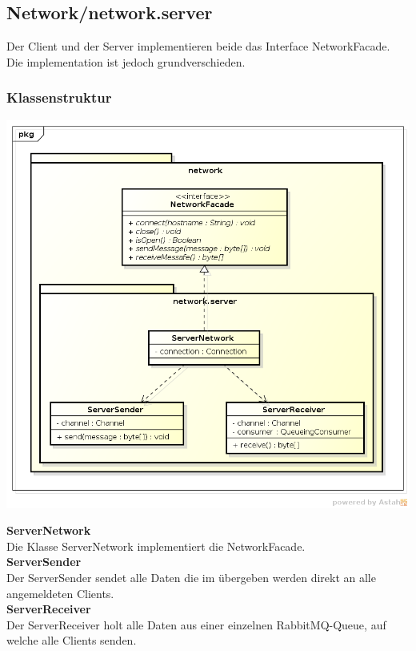 \documentclass[11pt]{scrartcl}
\begin{document}
\newpage

\subsection{Network/network.server}

Der Client und der Server implementieren beide das Interface NetworkFacade. Die implementation ist jedoch grundverschieden.

\subsubsection{Klassenstruktur}
\includegraphics[scale=0.5]{ClassDiagramNetworkServer}

\textbf{ServerNetwork}\\
Die Klasse ServerNetwork implementiert die NetworkFacade.\\

\textbf{ServerSender}\\
Der ServerSender sendet alle Daten die im übergeben werden direkt an alle angemeldeten Clients.\\

\textbf{ServerReceiver}\\
Der ServerReceiver holt alle Daten aus einer einzelnen RabbitMQ-Queue, auf welche alle Clients senden.\\
\end{document}
